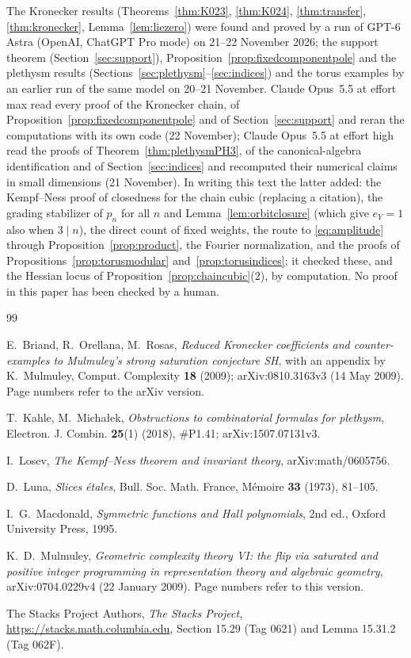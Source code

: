\documentclass[11pt,a4paper]{article}
\theoremstyle{definition}
\begin{document}
The Kronecker results (Theorems~\ref{thm:K023}, \ref{thm:K024},
\ref{thm:transfer}, \ref{thm:kronecker}, Lemma~\ref{lem:liezero}) were found
and proved by a run of GPT-6 Astra (OpenAI, ChatGPT Pro mode) on 21--22
November 2026; the support theorem (Section~\ref{sec:support}),
Proposition~\ref{prop:fixedcomponentpole} and the plethysm results
(Sections~\ref{sec:plethysm}--\ref{sec:indices}) and the torus examples by an
earlier run of the same model on 20--21 November. Claude Opus~5.5 at effort max
read every proof of the Kronecker chain, of
Proposition~\ref{prop:fixedcomponentpole} and of Section~\ref{sec:support} and
reran the computations with its own code (22 November); Claude Opus~5.5 at
effort high read the proofs of Theorem~\ref{thm:plethysmPH3}, of the
canonical-algebra identification and of Section~\ref{sec:indices} and recomputed
their numerical claims in small dimensions (21 November). In writing this text
the latter added: the Kempf--Ness proof of closedness for the chain cubic
(replacing a citation), the grading stabilizer of $p_n$ for all $n$ and
Lemma~\ref{lem:orbitclosure} (which give $e_Y=1$ also when $3\mid n$), the
direct count of fixed weights, the route to \eqref{eq:amplitude} through
Proposition~\ref{prop:product}, the Fourier normalization, and the proofs of
Propositions~\ref{prop:torusmodular} and~\ref{prop:torusindices}; it checked
these, and the Hessian locus of Proposition~\ref{prop:chaincubic}(2), by
computation. No proof in this paper has been checked by a human.

\begin{thebibliography}{99}

E.~Briand, R.~Orellana, M.~Rosas, \emph{Reduced Kronecker coefficients and
counter-examples to Mulmuley's strong saturation conjecture SH}, with an
appendix by K.~Mulmuley, Comput. Complexity \textbf{18} (2009);
arXiv:0810.3163v3 (14 May 2009). Page numbers refer to the arXiv version.

T.~Kahle, M.~Micha\l{}ek, \emph{Obstructions to combinatorial formulas for
plethysm}, Electron. J. Combin. \textbf{25}(1) (2018), \#P1.41;
arXiv:1507.07131v3.

I.~Losev, \emph{The Kempf--Ness theorem and invariant theory},
arXiv:math/0605756.

D.~Luna, \emph{Slices \'etales}, Bull. Soc. Math. France, M\'emoire \textbf{33}
(1973), 81--105.

I.~G.~Macdonald, \emph{Symmetric functions and Hall polynomials}, 2nd ed.,
Oxford University Press, 1995.

K.~D.~Mulmuley, \emph{Geometric complexity theory VI: the flip via saturated
and positive integer programming in representation theory and algebraic
geometry}, arXiv:0704.0229v4 (22 January 2009). Page numbers refer to this
version.

The Stacks Project Authors, \emph{The Stacks Project},
\url{https://stacks.math.columbia.edu}, Section 15.29 (Tag 0621) and
Lemma 15.31.2 (Tag 062F).

\end{thebibliography}
\end{document}
